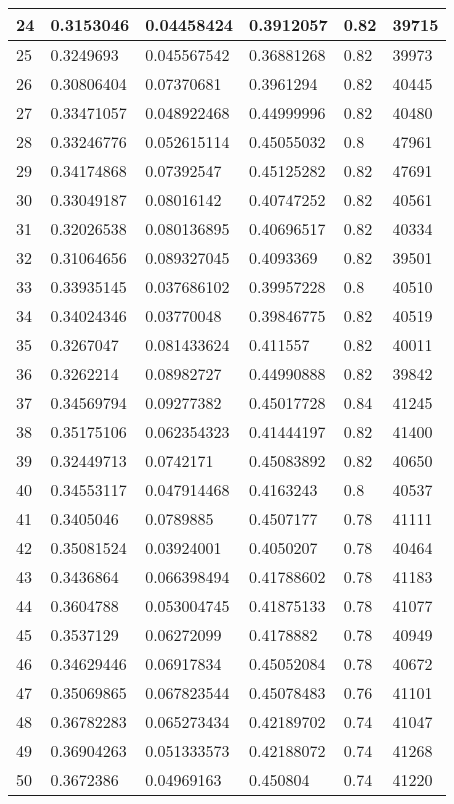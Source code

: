 \begin{longtable}{|l|l|l|l|l|l|}
24 & 0.3153046 & 0.04458424 & 0.3912057 & 0.82 & 39715 \\ \hline 
25 & 0.3249693 & 0.045567542 & 0.36881268 & 0.82 & 39973 \\ \hline 
26 & 0.30806404 & 0.07370681 & 0.3961294 & 0.82 & 40445 \\ \hline 
27 & 0.33471057 & 0.048922468 & 0.44999996 & 0.82 & 40480 \\ \hline 
28 & 0.33246776 & 0.052615114 & 0.45055032 & 0.8 & 47961 \\ \hline 
29 & 0.34174868 & 0.07392547 & 0.45125282 & 0.82 & 47691 \\ \hline 
30 & 0.33049187 & 0.08016142 & 0.40747252 & 0.82 & 40561 \\ \hline 
31 & 0.32026538 & 0.080136895 & 0.40696517 & 0.82 & 40334 \\ \hline 
32 & 0.31064656 & 0.089327045 & 0.4093369 & 0.82 & 39501 \\ \hline 
33 & 0.33935145 & 0.037686102 & 0.39957228 & 0.8 & 40510 \\ \hline 
34 & 0.34024346 & 0.03770048 & 0.39846775 & 0.82 & 40519 \\ \hline 
35 & 0.3267047 & 0.081433624 & 0.411557 & 0.82 & 40011 \\ \hline 
36 & 0.3262214 & 0.08982727 & 0.44990888 & 0.82 & 39842 \\ \hline 
37 & 0.34569794 & 0.09277382 & 0.45017728 & 0.84 & 41245 \\ \hline 
38 & 0.35175106 & 0.062354323 & 0.41444197 & 0.82 & 41400 \\ \hline 
39 & 0.32449713 & 0.0742171 & 0.45083892 & 0.82 & 40650 \\ \hline 
40 & 0.34553117 & 0.047914468 & 0.4163243 & 0.8 & 40537 \\ \hline 
41 & 0.3405046 & 0.0789885 & 0.4507177 & 0.78 & 41111 \\ \hline 
42 & 0.35081524 & 0.03924001 & 0.4050207 & 0.78 & 40464 \\ \hline 
43 & 0.3436864 & 0.066398494 & 0.41788602 & 0.78 & 41183 \\ \hline 
44 & 0.3604788 & 0.053004745 & 0.41875133 & 0.78 & 41077 \\ \hline 
45 & 0.3537129 & 0.06272099 & 0.4178882 & 0.78 & 40949 \\ \hline 
46 & 0.34629446 & 0.06917834 & 0.45052084 & 0.78 & 40672 \\ \hline 
47 & 0.35069865 & 0.067823544 & 0.45078483 & 0.76 & 41101 \\ \hline 
48 & 0.36782283 & 0.065273434 & 0.42189702 & 0.74 & 41047 \\ \hline 
49 & 0.36904263 & 0.051333573 & 0.42188072 & 0.74 & 41268 \\ \hline 
50 & 0.3672386 & 0.04969163 & 0.450804 & 0.74 & 41220 \\ \hline 
\end{longtable}